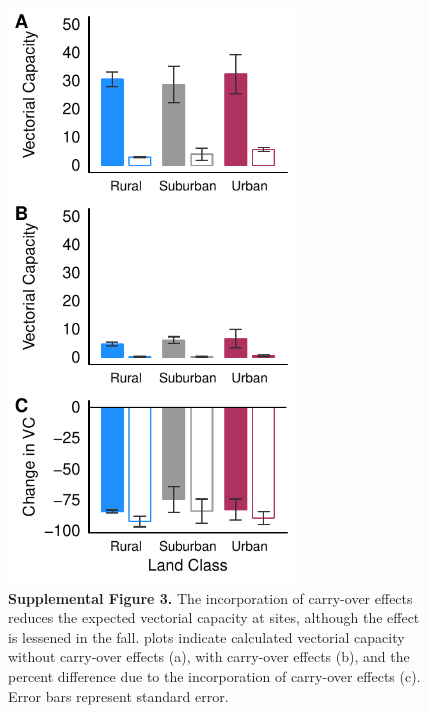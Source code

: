 \documentclass[12pt]{article}
\begin{document}
\begin{figure}
\centering
\includegraphics[width=3in]{SuppFig3.pdf}
\caption{\textbf{Supplemental Figure 3.} The incorporation of carry-over effects reduces the expected vectorial capacity at sites, although the effect is lessened in the fall. plots indicate calculated vectorial capacity without carry-over effects (a), with carry-over effects (b), and the percent difference due to the incorporation of carry-over effects (c). Error bars represent standard error.}
\end{figure}



\newpage
\end{document}
